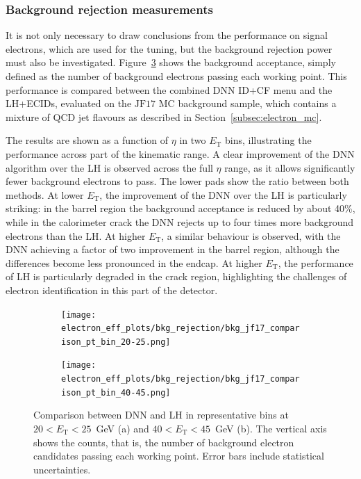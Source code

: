 \subsubsection{Background rejection measurements}

It is not only necessary to draw conclusions from the performance on signal electrons, which are used for the tuning, but the background rejection power must also be investigated. Figure~\ref{fig:bkg_acceptance_mc} shows the background acceptance, simply defined as the number of background electrons passing each working point. This performance is compared between the combined DNN ID+CF menu and the LH+ECIDs, evaluated on the $\text{JF}17$ MC background sample, which contains a mixture of QCD jet flavours as described in Section~\ref{subsec:electron_mc}. 

The results are shown as a function of $\eta$ in two $E_{\mathrm{T}}$ bins, illustrating the performance across part of the kinematic range. A clear improvement of the DNN algorithm over the LH is observed across the full $\eta$ range, as it allows significantly fewer background electrons to pass. The lower pads show the ratio between both methods. 
At lower $E_{\mathrm{T}}$, the improvement of the DNN over the LH is particularly striking: 
in the barrel region the background acceptance is reduced by about 40\%, 
while in the calorimeter crack the DNN rejects up to four times more background electrons than the LH. 
At higher $E_{\mathrm{T}}$, a similar behaviour is observed, with the DNN achieving a factor of two improvement in the barrel region, 
although the differences become less pronounced in the endcap. 
At higher $E_{\mathrm{T}}$, the performance of LH is particularly degraded in the crack region, highlighting the challenges of electron identification in this part of the detector.

\begin{figure}[htbp]
  \centering
  \begin{subfigure}{0.48\textwidth}
    \centering
    \texttt{[image: electron\_eff\_plots/bkg\_rejection/bkg\_jf17\_comparison\_pt\_bin\_20-25.png]}
    \caption{}
    \label{fig:bkg_acceptance_jf17_20_25}
  \end{subfigure}
  \hfill
  \begin{subfigure}{0.48\textwidth}
    \centering
    \texttt{[image: electron\_eff\_plots/bkg\_rejection/bkg\_jf17\_comparison\_pt\_bin\_40-45.png]}
    \caption{}
    \label{fig:bkg_acceptance_jf17_40_45}
  \end{subfigure}
\caption{Comparison between DNN and LH in representative bins at $20<E_{\mathrm{T}}<25$~GeV (a) and $40<E_{\mathrm{T}}<45$~GeV (b). The vertical axis shows the counts, that is, the number of background electron candidates passing each working point. Error bars include statistical uncertainties.}
\label{fig:bkg_acceptance_mc}
\end{figure}

